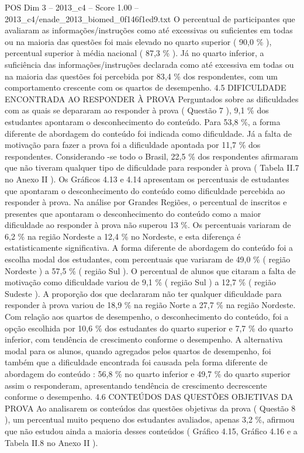 \begin{textsample}{POS Dim 3 – 2013\_c4 – Score 1.00 – 2013\_c4/enade\_2013\_biomed\_0f146f1ed9.txt}
O percentual de participantes que avaliaram as informações/instruções como até excessivas ou suficientes em todas ou na maioria das questões foi mais elevado no quarto superior ( 90,0 \% ), percentual superior à média nacional ( 87,3 \% ).
Já no quarto inferior, a suficiência das informações/instruções declarada como até excessiva em todas ou na maioria das questões foi percebida por 83,4 \% dos respondentes, com um comportamento crescente com os quartos de desempenho. 4.5 DIFICULDADE ENCONTRADA AO RESPONDER À PROVA Perguntados sobre as dificuldades com as quais se depararam ao responder à prova ( Questão 7 ), 9,1 \% dos estudantes apontaram o desconhecimento do conteúdo.
Para 53,8 \%, a forma diferente de abordagem do conteúdo foi indicada como dificuldade.
Já a falta de motivação para fazer a prova foi a dificuldade apontada por 11,7 \% dos respondentes.
Considerando -se todo o Brasil, 22,5 \% dos respondentes afirmaram que não tiveram qualquer tipo de dificuldade para responder à prova ( Tabela II.7 no Anexo II ).
Os Gráficos 4.13 e 4.14 apresentam os percentuais de estudantes que apontaram o desconhecimento do conteúdo como dificuldade percebida ao responder à prova.
Na análise por Grandes Regiões, o percentual de inscritos e presentes que apontaram o desconhecimento do conteúdo como a maior dificuldade ao responder à prova não superou 13 \%.
Os percentuais variaram de 6,2 \% na região Nordeste a 12,4 \% no Nordeste, e esta diferença é estatisticamente significativa.
A forma diferente de abordagem do conteúdo foi a escolha modal dos estudantes, com percentuais que variaram de 49,0 \% ( região Nordeste ) a 57,5 \% ( região Sul ).
O percentual de alunos que citaram a falta de motivação como dificuldade variou de 9,1 \% ( região Sul ) a 12,7 \% ( região Sudeste ).
A proporção dos que declararam não ter qualquer dificuldade para responder à prova variou de 18,9 \% na região Norte a 27,7 \% na região Nordeste.
Com relação aos quartos de desempenho, o desconhecimento do conteúdo, foi a opção escolhida por 10,6 \% dos estudantes do quarto superior e 7,7 \% do quarto inferior, com tendência de crescimento conforme o desempenho.
A alternativa modal para os alunos, quando agregados pelos quartos de desempenho, foi também que a dificuldade encontrada foi causada pela forma diferente de abordagem do conteúdo : 56,8 \% no quarto inferior e 49,7 \% do quarto superior assim o responderam, apresentando tendência de crescimento decrescente conforme o desempenho. 4.6 CONTEÚDOS DAS QUESTÕES OBJETIVAS DA PROVA Ao analisarem os conteúdos das questões objetivas da prova ( Questão 8 ), um percentual muito pequeno dos estudantes avaliados, apenas 3,2 \%, afirmou que não estudou ainda a maioria desses conteúdos ( Gráfico 4.15, Gráfico 4.16 e a Tabela II.8 no Anexo II ).

\end{textsample}
